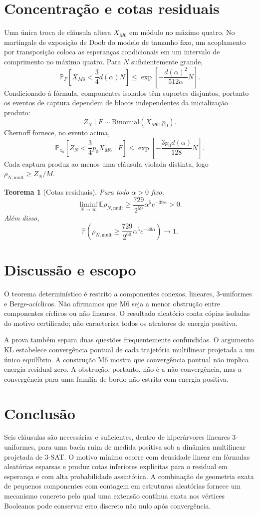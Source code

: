 \documentclass[11pt,a4paper]{article}
\newtheorem{theorem}{Teorema}[section]
\begin{document}
\section{Concentração e cotas residuais}
Uma única troca de cláusula altera $X_{M6}$ em módulo no máximo quatro. No martingale de exposição de Doob do modelo de tamanho fixo, um acoplamento por transposição coloca as esperanças condicionais em um intervalo de comprimento no máximo quatro. Para $N$ suficientemente grande,
\begin{equation}
\mathbb P_F\!\left[X_{M6}<\frac34d(\alpha)N\right]\le \exp\!\left[-\frac{d(\alpha)^2}{512\alpha}N\right].
\end{equation}
Condicionado à fórmula, componentes isolados têm suportes disjuntos, portanto os eventos de captura dependem de blocos independentes da inicialização produto:
\[
Z_N\mid F\sim\mathrm{Binomial}(X_{M6},p_0).
\]
Chernoff fornece, no evento acima,
\[
\mathbb P_{x_0}\!\left[Z_N<\frac34p_0X_{M6}\mid F\right]\le \exp\!\left[-\frac{3p_0d(\alpha)}{128}N\right].
\]
Cada captura produz ao menos uma cláusula violada distinta, logo $\rho_{N,\mathrm{mult}}\ge Z_N/M$.

\begin{theorem}[Cotas residuais]
Para todo $\alpha>0$ fixo,
\[
\liminf_{N\to\infty}\mathbb E\rho_{N,\mathrm{mult}}\ge \frac{729}{2^{59}}\alpha^5e^{-39\alpha}>0.
\]
Além disso,
\[
\mathbb P\!\left(\rho_{N,\mathrm{mult}}\ge \frac{729}{2^{60}}\alpha^5e^{-39\alpha}\right)\to1.
\]
\end{theorem}

\section{Discussão e escopo}
O teorema determinístico é restrito a componentes conexos, lineares, 3-uniformes e Berge-acíclicos. Não afirmamos que M6 seja a menor obstrução entre componentes cíclicos ou não lineares. O resultado aleatório conta cópias isoladas do motivo certificado; não caracteriza todos os atratores de energia positiva.

A prova também separa duas questões frequentemente confundidas. O argumento KL estabelece convergência pontual de cada trajetória multilinear projetada a um único equilíbrio. A construção M6 mostra que convergência pontual não implica energia residual zero. A obstrução, portanto, não é a não convergência, mas a convergência para uma família de bordo não estrita com energia positiva.

\section{Conclusão}
Seis cláusulas são necessárias e suficientes, dentro de hiperárvores lineares 3-uniformes, para uma bacia ruim de medida positiva sob a dinâmica multilinear projetada de 3-SAT. O motivo mínimo ocorre com densidade linear em fórmulas aleatórias esparsas e produz cotas inferiores explícitas para o residual em esperança e com alta probabilidade assintótica. A combinação de geometria exata de pequenos componentes com contagem em estruturas aleatórias fornece um mecanismo concreto pelo qual uma extensão contínua exata nos vértices Booleanos pode conservar erro discreto não nulo após convergência.
\end{document}
